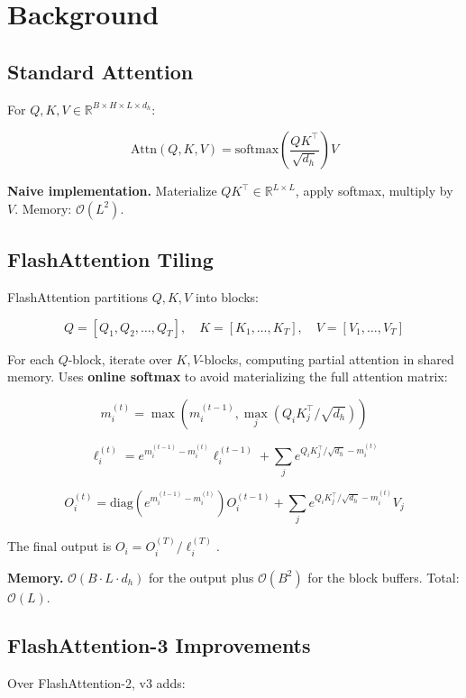 \section{Background}

\subsection{Standard Attention}

For $Q, K, V \in \mathbb{R}^{B \times H \times L \times d_h}$:

\[
\text{Attn}(Q, K, V) = \text{softmax}\!\left(\frac{Q K^\top}{\sqrt{d_h}}\right) V
\tag{3.1}
\]

\textbf{Naive implementation.} Materialize $QK^\top \in \mathbb{R}^{L \times L}$, 
apply softmax, multiply by $V$. Memory: $\mathcal{O}(L^2)$.

\subsection{FlashAttention Tiling}

FlashAttention partitions $Q, K, V$ into blocks:

\[
Q = [Q_1, Q_2, \dots, Q_T], \quad K = [K_1, \dots, K_T], \quad V = [V_1, \dots, V_T]
\tag{3.2}
\]

For each $Q$-block, iterate over $K, V$-blocks, computing partial attention 
in shared memory. Uses \textbf{online softmax} to avoid materializing the full 
attention matrix:

\[
m_i^{(t)} = \max(m_i^{(t-1)}, \max_j (Q_i K_j^\top / \sqrt{d_h}))
\tag{3.3}
\]

\[
\ell_i^{(t)} = e^{m_i^{(t-1)} - m_i^{(t)}} \ell_i^{(t-1)} + \sum_j e^{Q_i K_j^\top / \sqrt{d_h} - m_i^{(t)}}
\tag{3.4}
\]

\[
O_i^{(t)} = \text{diag}(e^{m_i^{(t-1)} - m_i^{(t)}}) O_i^{(t-1)} + \sum_j e^{Q_i K_j^\top / \sqrt{d_h} - m_i^{(t)}} V_j
\tag{3.5}
\]

The final output is $O_i = O_i^{(T)} / \ell_i^{(T)}$.

\textbf{Memory.} $\mathcal{O}(B \cdot L \cdot d_h)$ for the output plus 
$\mathcal{O}(B^2)$ for the block buffers. Total: $\mathcal{O}(L)$.

\subsection{FlashAttention-3 Improvements}

Over FlashAttention-2, v3 adds:

